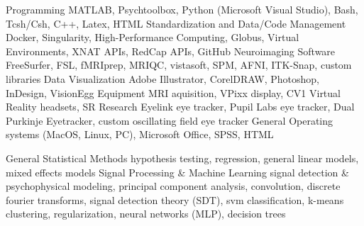 \begin{cvtech}
  \cvtechentry
    {Programming}
    {MATLAB, Psychtoolbox, Python (Microsoft Visual Studio), Bash, Tcsh/Csh, C++, Latex, HTML}
  \cvtechentry
    {Standardization and Data/Code Management}
    {Docker, Singularity, High-Performance Computing, Globus, Virtual Environments, XNAT APIs, RedCap APIs, GitHub}
  \cvtechentry
    {Neuroimaging Software}
    {FreeSurfer, FSL, fMRIprep, MRIQC, vistasoft, SPM, AFNI, ITK-Snap, custom libraries}
  \cvtechentry
    {Data Visualization}
    {Adobe Illustrator, CorelDRAW, Photoshop, InDesign, VisionEgg}
  \cvtechentry
    {Equipment}
    {MRI aquisition, VPixx display, CV1 Virtual Reality headsets, SR Research Eyelink eye tracker, Pupil Labs eye tracker, Dual Purkinje Eyetracker, custom oscillating field eye tracker}
  \cvtechentry
    {General}
    {Operating systems (MacOS, Linux, PC), Microsoft Office, SPSS, HTML}
\end{cvtech}

\begin{cvtech}
  \cvtechentry
    {General Statistical Methods}
    {hypothesis testing, regression, general linear models, mixed effects models}
  \cvtechentry
    {Signal Processing \& Machine Learning}
    {signal detection \& psychophysical modeling, principal component analysis, convolution, discrete fourier transforms, signal detection theory (SDT), svm classification, k-means clustering, regularization, neural networks (MLP), decision trees}
\end{cvtech}
